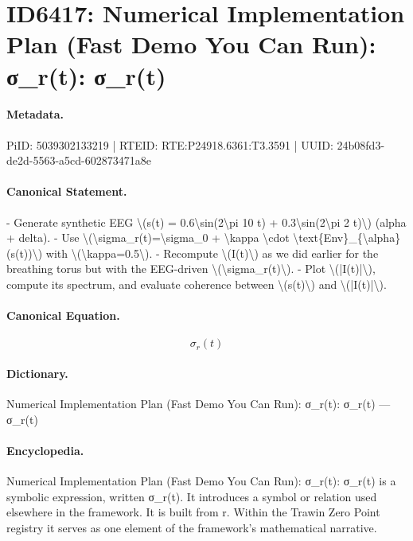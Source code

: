 \section*{ID6417: Numerical Implementation Plan (Fast Demo You Can Run): σ\_r(t): σ\_r(t)}
\paragraph{Metadata.}
PiID: 5039302133219 | RTEID: RTE:P24918.6361:T3.3591 | UUID: 24b08fd3-de2d-5563-a5cd-602873471a8e

\paragraph{Canonical Statement.}
- Generate synthetic EEG \textbackslash{}(s(t) = 0.6\textbackslash{}sin(2\textbackslash{}pi 10 t) + 0.3\textbackslash{}sin(2\textbackslash{}pi 2 t)\textbackslash{}) (alpha + delta). - Use \textbackslash{}(\textbackslash{}sigma\_r(t)=\textbackslash{}sigma\_0 + \textbackslash{}kappa \textbackslash{}cdot \textbackslash{}text\{Env\}\_\{\textbackslash{}alpha\}(s(t))\textbackslash{}) with \textbackslash{}(\textbackslash{}kappa=0.5\textbackslash{}). - Recompute \textbackslash{}(I(t)\textbackslash{}) as we did earlier for the breathing torus but with the EEG-driven \textbackslash{}(\textbackslash{}sigma\_r(t)\textbackslash{}). - Plot \textbackslash{}(|I(t)|\textbackslash{}), compute its spectrum, and evaluate coherence between \textbackslash{}(s(t)\textbackslash{}) and \textbackslash{}(|I(t)|\textbackslash{}).

\paragraph{Canonical Equation.}
\[
\sigma_r(t)
\]

\paragraph{Dictionary.}
Numerical Implementation Plan (Fast Demo You Can Run): σ\_r(t): σ\_r(t) — σ\_r(t)

\paragraph{Encyclopedia.}
Numerical Implementation Plan (Fast Demo You Can Run): σ\_r(t): σ\_r(t) is a symbolic expression, written σ\_r(t). It introduces a symbol or relation used elsewhere in the framework. It is built from r. Within the Trawin Zero Point registry it serves as one element of the framework's mathematical narrative.
